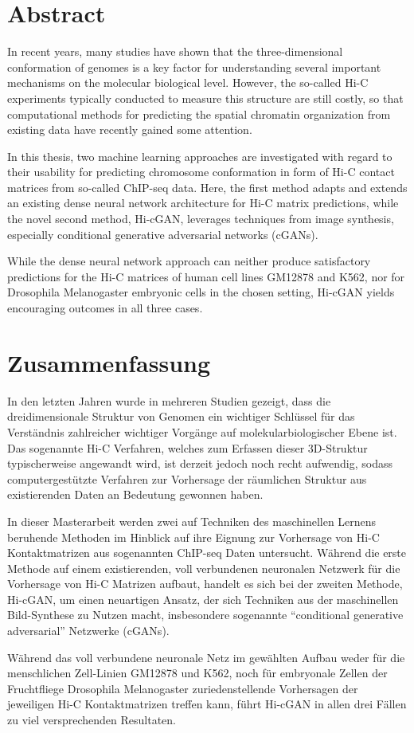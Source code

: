 \section*{Abstract}

In recent years, many studies have shown that the three-dimensional conformation of genomes is a key factor
for understanding several important mechanisms on the molecular biological level.
However, the so-called Hi-C experiments typically conducted to measure this structure are still costly,
so that computational methods for predicting the spatial chromatin organization from existing data have recently gained some attention. 

In this thesis, two machine learning approaches are investigated with 
regard to their usability for predicting chromosome conformation in form of Hi-C contact matrices from so-called ChIP-seq data.
Here, the first method adapts and extends an existing dense neural network architecture for Hi-C matrix predictions, 
while the novel second method, Hi-cGAN, leverages techniques from image synthesis, especially conditional generative adversarial networks (cGANs).

While the dense neural network approach can neither produce satisfactory predictions for the Hi\hbox{-}C matrices of human cell lines GM12878 and K562,
nor for Drosophila Melanogaster embryonic cells in the chosen setting, Hi-cGAN yields encouraging outcomes in all three cases.


\section*{Zusammenfassung}

In den letzten Jahren wurde in mehreren Studien gezeigt, dass die dreidimensionale Struktur von Genomen ein
wichtiger Schlüssel für das Verständnis zahlreicher wichtiger Vorgänge auf molekularbiologischer Ebene ist.
Das sogenannte Hi-C Verfahren, welches zum Erfassen dieser 3D-Struktur typischerweise angewandt wird,
ist derzeit jedoch noch recht aufwendig, sodass computergestützte Verfahren zur Vorhersage 
der räumlichen Struktur aus existierenden Daten an Bedeutung gewonnen haben.

In dieser Masterarbeit werden zwei auf Techniken des maschinellen Lernens beruhende Methoden im Hinblick auf ihre Eignung  
zur Vorhersage von Hi-C Kontaktmatrizen aus sogenannten ChIP-seq Daten untersucht.
Während die erste Methode auf einem existierenden, voll verbundenen neuronalen Netzwerk für die Vorhersage von Hi-C Matrizen aufbaut,
handelt es sich bei der zweiten Methode, Hi-cGAN, um einen neuartigen Ansatz, der sich Techniken aus der maschinellen Bild-Synthese zu Nutzen macht,
insbesondere sogenannte ``conditional generative adversarial'' Netzwerke (cGANs).

Während das voll verbundene neuronale Netz im gewählten Aufbau weder für die menschlichen Zell-Linien GM12878 und K562, 
noch für embryonale Zellen der Fruchtfliege Drosophila Melanogaster zuriedenstellende Vorhersagen der jeweiligen Hi-C Kontaktmatrizen treffen kann, 
führt Hi-cGAN in allen drei Fällen zu viel versprechenden Resultaten.
